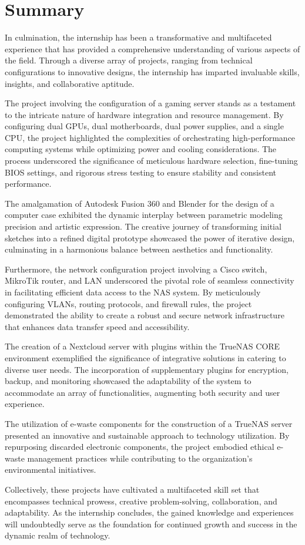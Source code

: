 \section{Summary}

In culmination, the internship has been a transformative and multifaceted experience that has provided a comprehensive understanding of various aspects of the field. Through a diverse array of projects, ranging from technical configurations to innovative designs, the internship has imparted invaluable skills, insights, and collaborative aptitude.

The project involving the configuration of a gaming server stands as a testament to the intricate nature of hardware integration and resource management. By configuring dual GPUs, dual motherboards, dual power supplies, and a single CPU, the project highlighted the complexities of orchestrating high-performance computing systems while optimizing power and cooling considerations. The process underscored the significance of meticulous hardware selection, fine-tuning BIOS settings, and rigorous stress testing to ensure stability and consistent performance.

The amalgamation of Autodesk Fusion 360 and Blender for the design of a computer case exhibited the dynamic interplay between parametric modeling precision and artistic expression. The creative journey of transforming initial sketches into a refined digital prototype showcased the power of iterative design, culminating in a harmonious balance between aesthetics and functionality.

Furthermore, the network configuration project involving a Cisco switch, MikroTik router, and LAN underscored the pivotal role of seamless connectivity in facilitating efficient data access to the NAS system. By meticulously configuring VLANs, routing protocols, and firewall rules, the project demonstrated the ability to create a robust and secure network infrastructure that enhances data transfer speed and accessibility.

The creation of a Nextcloud server with plugins within the TrueNAS CORE environment exemplified the significance of integrative solutions in catering to diverse user needs. The incorporation of supplementary plugins for encryption, backup, and monitoring showcased the adaptability of the system to accommodate an array of functionalities, augmenting both security and user experience.

The utilization of e-waste components for the construction of a TrueNAS server presented an innovative and sustainable approach to technology utilization. By repurposing discarded electronic components, the project embodied ethical e-waste management practices while contributing to the organization's environmental initiatives.

Collectively, these projects have cultivated a multifaceted skill set that encompasses technical prowess, creative problem-solving, collaboration, and adaptability. As the internship concludes, the gained knowledge and experiences will undoubtedly serve as the foundation for continued growth and success in the dynamic realm of technology.

